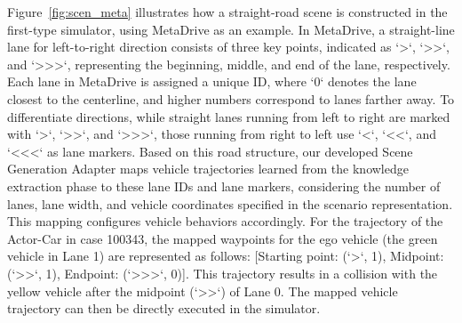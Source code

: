 
Figure~\ref{fig:scen_meta} illustrates how a straight-road scene is constructed in the first-type simulator, using MetaDrive as an example. In MetaDrive, a straight-line lane for left-to-right direction consists of three key points, indicated as `>`, `>>`, and `>>>`, representing the beginning, middle, and end of the lane, respectively. Each lane in MetaDrive is assigned a unique ID, where `0` denotes the lane closest to the centerline, and higher numbers correspond to lanes farther away. To differentiate directions, while straight lanes running from left to right are marked with `>`, `>>`, and `>>>`,  those running from right to left use `<`, `<<`, and `<<<` as lane markers. Based on this road structure, our developed Scene Generation Adapter maps vehicle trajectories learned from the knowledge extraction phase to these lane IDs and lane markers, considering the number of lanes, lane width, and vehicle coordinates specified in the scenario representation. This mapping configures vehicle behaviors accordingly. For the trajectory of the Actor-Car in case 100343, the mapped waypoints for the ego vehicle (the green vehicle in Lane 1) are represented as follows: [Starting point: (`>`, 1), Midpoint: (`>>`, 1), Endpoint: (`>>>`, 0)]. This trajectory results in a collision with the yellow vehicle after the midpoint (`>>`) of Lane 0. The mapped vehicle trajectory can then be directly executed in the simulator.

